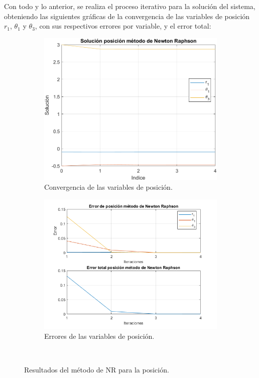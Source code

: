 \documentclass[12pt]{article}
\begin{document}
Con todo y lo anterior, se realiza el proceso iterativo para la solución del sistema, obteniendo las siguientes gráficas de la convergencia de las variables de posición $r_1$, $\theta_1$ y $\theta_3$, con sus respectivos errores por variable, y el error total:
\begin{figure}[H]
\centering
  \begin{subfigure}[b]{0.49\textwidth}
    \includegraphics[width=7.5 cm, height=7.5 cm, keepaspectratio]{Implementacion/solucion pos NR.png}
    \caption{Convergencia de las variables de posición.}
    \label{}
  \end{subfigure}
  \hfill
  \begin{subfigure}[b]{0.49\textwidth}
    \includegraphics[width=8.5 cm, height=8.5 cm, keepaspectratio]{Implementacion/error pos NR.png}
    \caption{Errores de las variables de posición.}
    \label{}
  \end{subfigure}\\
  \vspace{10pt}
  \caption{Resultados del método de NR para la posición.}
\end{figure}
\end{document}
